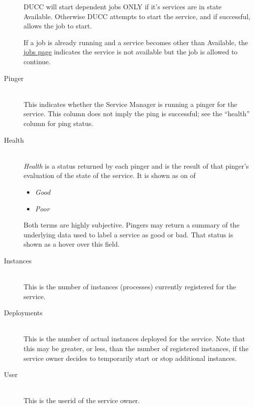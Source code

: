 \begin{description}
              DUCC will start dependent jobs ONLY if it's services are in state Available.  Otherwise
              DUCC attempts to start the service, and if successful, allows the job to start.  

              If a job is already running and a service becomes other than Available, the
              \hyperref[sec:ws.jobs-page]{jobs page} indicates the service is not available but the job is 
              allowed to continue.
              
            \item[Pinger] \hfill \\
              This indicates whether the Service Manager is running a pinger for the service.  This column
              does not imply the ping is successful; see the ``health'' column for ping status.
              
            \item[Health] \hfill \\
              {\em Health} is a status returned by each pinger and is the result of that pinger's
              evaluation of the state of the service.  It is shown as on of
              \begin{itemize}
                \item {\em Good}
                \item {\em Poor}
              \end{itemize}
              Both terms are highly subjective.  Pingers may return a summary of the underlying
              data used to label a service as good or bad.  That status is shown as a hover over
              this field.
              
            \item[Instances] \hfill \\
              This is the number of instances (processes) currently registered for the service.  

            \item[Deployments] \hfill \\
              This is the number of actual instances deployed for the service.  Note that this may
              be greater, or less, than the number of registered instances, if the service owner
              decides to temporarily start or stop additional instances.

            \item[User] \hfill \\
              This is the userid of the service owner.
              

\end{description}
